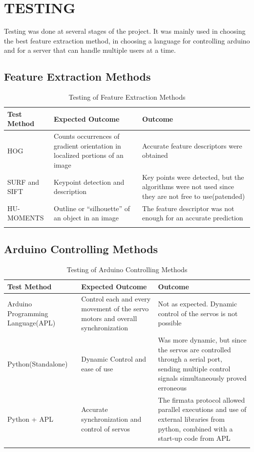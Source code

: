 \documentclass{fisatproject}
\begin{document}
\chapter{TESTING}
Testing was done at several stages of the project. It was mainly used in choosing the best feature extraction method, in choosing a language for controlling arduino and for a server that can handle multiple users at a time.
\section{Feature Extraction Methods}
\begin{longtable}{ | p{5cm} | p{5cm} | p{5cm} |}
      \hline
      \textbf{Test Method} & \textbf{Expected Outcome} & \textbf{Outcome}\\
      \hline
      HOG & Counts occurrences of gradient orientation in localized portions of an image & Accurate feature descriptors were obtained\\
      \hline
      SURF and SIFT & Keypoint detection and description & Key points were detected, but the algorithms were not used since they are not free to use(patended)\\
      \hline
      HU-MOMENTS & Outline or “silhouette” of an object in an image & The feature descriptor was not enough for an accurate prediction\\
      \hline
\caption{Testing of Feature Extraction Methods}
\label{table:1}
\end{longtable}

\section{Arduino Controlling Methods}
\begin{longtable}{ | p{5cm} | p{5cm} | p{5cm} |}
      \hline
      \textbf{Test Method} & \textbf{Expected Outcome} & \textbf{Outcome}\\
      \hline
      Arduino Programming Language(APL) & Control each and every movement of the servo motors and overall synchronization & Not as expected. Dynamic control of the servos is not possible\\
      \hline
      Python(Standalone) & Dynamic Control and ease of use & Was more dynamic, but since the servos are controlled through a serial port, sending multiple control signals simultaneously proved erroneous\\
      \hline
      Python + APL & Accurate synchronization and control of servos & The firmata protocol allowed parallel executions and use of external libraries from python, combined with a start-up code from APL\\
      \hline
\caption{Testing of Arduino Controlling Methods}
\label{table:2}
\end{longtable}
\end{document}
